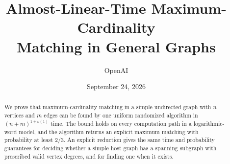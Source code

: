 \documentclass[11pt]{article}
\title{Almost-Linear-Time Maximum-Cardinality\\Matching in General Graphs}
\author{OpenAI}
\date{September 24, 2026}
\begin{document}
\maketitle
\begin{abstract}
We prove that maximum-cardinality matching in a simple undirected graph with
$n$ vertices and $m$ edges can be found by one uniform randomized algorithm in
$(n+m)^{1+o(1)}$ time. The bound holds on every computation path in a
logarithmic-word model, and the algorithm returns an explicit maximum matching
with probability at least $2/3$.
An explicit reduction gives the same time and probability guarantees for
deciding whether a simple host graph has a spanning subgraph with prescribed
valid vertex degrees, and for finding one when it exists.
\end{abstract}
\tableofcontents
\clearpage










\clearpage
{}
{}


\end{document}

